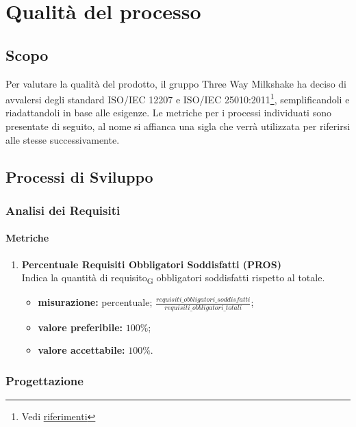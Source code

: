 \section{Qualità del processo}

\subsection{Scopo}
Per valutare  la qualità del prodotto, il gruppo Three Way Milkshake ha deciso di avvalersi degli standard ISO/IEC 12207 e ISO/IEC 25010:2011\footnote{Vedi \hyperref[ref]{riferimenti}}, semplificandoli e riadattandoli in base alle esigenze. Le metriche per i processi individuati sono presentate di seguito, al nome si affianca una sigla che verrà utilizzata per riferirsi alle stesse successivamente.

\subsection{Processi di Sviluppo}

\subsubsection{Analisi dei Requisiti}
\paragraph{Metriche}
\begin{enumerate}
	\item []
	      \textbf{Percentuale Requisiti Obbligatori Soddisfatti (PROS)}\\
	      Indica la quantità di requisito\textsubscript{G} obbligatori soddisfatti rispetto al totale.
	      \begin{itemize}
		      \item \textbf{misurazione:} percentuale; $\frac{requisiti\_obbligatori\_soddisfatti}{requisiti\_obbligatori\_totali}$;
		      \item \textbf{valore preferibile:} $100\%$;
		      \item \textbf{valore accettabile:} $100\%$.
	      \end{itemize}
\end{enumerate}
\subsubsection{Progettazione}
